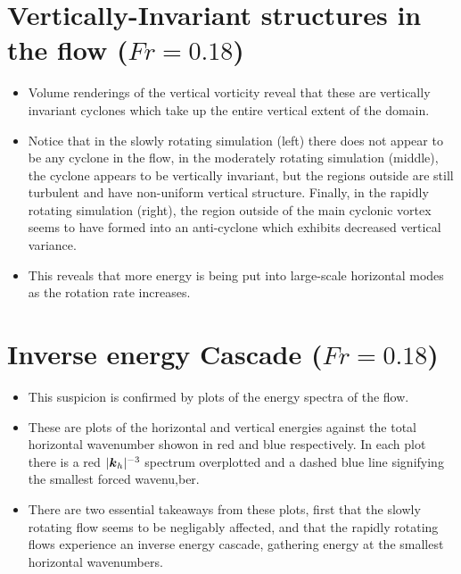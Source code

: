 \documentclass{article}
\begin{document}
\section{Vertically-Invariant structures in the flow ($Fr = 0.18$)}
\begin{itemize}

    \item Volume renderings of the vertical vorticity reveal that these are
    vertically invariant cyclones which take up the entire vertical extent of
    the domain. 
    \item Notice that in the slowly rotating simulation (left) there does not
    appear to be any cyclone in the flow, in the moderately rotating simulation
    (middle),
    the cyclone appears to be vertically invariant, but the regions outside are still
    turbulent and have non-uniform vertical structure. 
    Finally, in the rapidly rotating simulation (right), the region outside
    of the main cyclonic vortex seems to have formed into an anti-cyclone which
    exhibits decreased vertical variance. 
    \item This reveals that more energy is being put into large-scale horizontal
        modes as the rotation rate increases. 
\end{itemize}

\section{Inverse energy Cascade ($Fr = 0.18$)}
\begin{itemize}
    \item This suspicion is confirmed by plots of the energy spectra of the flow. 
    \item These are plots of the horizontal and vertical energies against the total
        horizontal wavenumber showon in red and blue respectively. In each plot
        there is a red $|\boldsymbol{k}_h|^{-3}$ spectrum overplotted and a dashed blue line
        signifying the smallest forced wavenu,ber. 
    \item There are two essential takeaways from these plots, first that the
        slowly rotating flow seems to be negligably affected, and that the
        rapidly rotating flows experience an inverse energy cascade, gathering
        energy at the smallest horizontal wavenumbers. 
\end{itemize}
\end{document}

